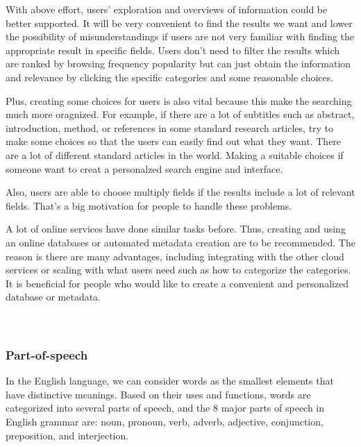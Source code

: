 With above effort, users' exploration and overviews of information could be better supported. It will be very convenient to find the results we want and lower the possibility of misunderstandings if users are not very familiar with finding the appropriate result in specific fields.\cite{TunThuraThet2010} Users don't need to filter the results which are ranked by browsing frequency popularity but can just obtain the information and relevance by clicking the specific categories and some reasonable choices.

Plus, creating some choices for users is also vital because this make the searching much more oragnized. For example, if there are a lot of subtitles such as abstract, introduction, method, or references in some standard research articles, try to make some choices so that the users can easily find out what they want. There are a lot of different standard articles in the world. Making a suitable choices if someone want to creat a personalzed search engine and interface. 

Also, users are able to choose multiply fields if the results include a lot of relevant fields. That's a big motivation for people to handle these problems. 

A lot of online services have done similar tasks before. Thus, creating and using an online databases or automated metadata creation are to be recommended. The reason is there are many advantages, including integrating with the other cloud services or scaling with what users need such as how to categorize the categories. It is beneficial for people who would like to create a convenient and personalized database or metadata.\\\\\\


\subsubsection*{Part-of-speech}

In the English language, we can consider words as the smallest elements that have distinctive meanings. Based on their uses and functions, words are categorized into several parts of speech, and the 8 major parts of speech in English grammar are: noun, pronoun, verb, adverb, adjective, conjunction, preposition, and interjection.

